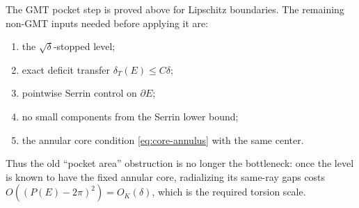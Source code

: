 \documentclass[11pt]{article}
\newcommand{\dT}{\delta_T}
\begin{document}
The GMT pocket step is proved above for Lipschitz boundaries.  The remaining
non-GMT inputs needed before applying it are:

\begin{enumerate}[label=\arabic*.]
\item the \(\sqrt\delta\)-stopped level;
\item exact deficit transfer \(\dT(E)\le C\delta\);
\item pointwise Serrin control on \(\partial E\);
\item no small components from the Serrin lower bound;
\item the annular core condition \eqref{eq:core-annulus} with the same center.
\end{enumerate}

Thus the old ``pocket area'' obstruction is no longer the bottleneck: once the
level is known to have the fixed annular core, radializing its same-ray gaps
costs \(O((P(E)-2\pi)^2)=O_K(\delta)\), which is the required torsion scale.
\end{document}
